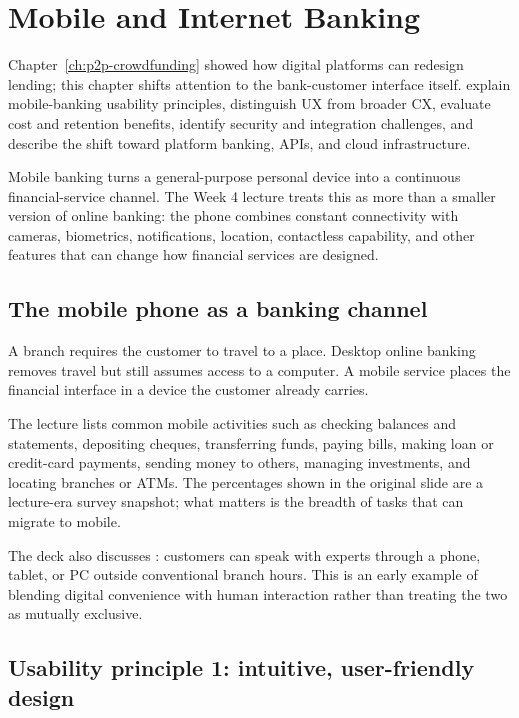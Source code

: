 \chapter{Mobile and Internet Banking}
\label{ch:mobile-banking}

\chapterguide%
  {Chapter~\ref{ch:p2p-crowdfunding} showed how digital platforms can redesign lending; this chapter shifts attention to the bank-customer interface itself.}
  {explain mobile-banking usability principles, distinguish UX from broader CX, evaluate cost and retention benefits, identify security and integration challenges, and describe the shift toward platform banking, APIs, and cloud infrastructure.}

Mobile banking turns a general-purpose personal device into a continuous financial-service channel. The Week 4 lecture treats this as more than a smaller version of online banking: the phone combines constant connectivity with cameras, biometrics, notifications, location, contactless capability, and other features that can change how financial services are designed.

\section{The mobile phone as a banking channel}

A branch requires the customer to travel to a place. Desktop online banking removes travel but still assumes access to a computer. A mobile service places the financial interface in a device the customer already carries.

The lecture lists common mobile activities such as checking balances and statements, depositing cheques, transferring funds, paying bills, making loan or credit-card payments, sending money to others, managing investments, and locating branches or ATMs. The percentages shown in the original slide are a lecture-era survey snapshot; what matters is the breadth of tasks that can migrate to mobile.

The deck also discusses : customers can speak with experts through a phone, tablet, or PC outside conventional branch hours. This is an early example of blending digital convenience with human interaction rather than treating the two as mutually exclusive.

\section{Usability principle 1: intuitive, user-friendly design}

